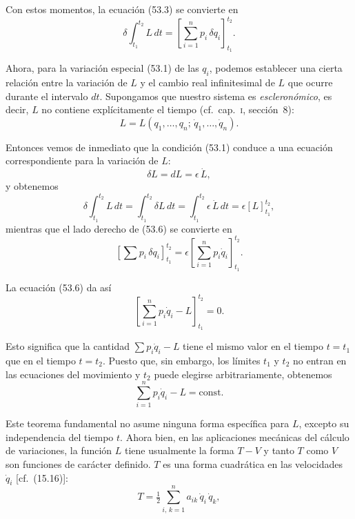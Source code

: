 \documentclass[12pt,a4paper]{book}
\begin{document}
Con estos momentos, la ecuación (53.3) se convierte en
\begin{equation}
\delta \int_{t_1}^{t_2} L \, dt = \left[ \sum_{i=1}^{n} p_i \,\delta q_i \right]_{t_1}^{t_2}. \tag{53.6}
\end{equation}

Ahora, para la variación especial (53.1) de las $q_i$, podemos establecer una cierta relación entre la variación de $L$ y el cambio real infinitesimal de $L$ que ocurre durante el intervalo $dt$. Supongamos que nuestro sistema es \textit{escleronómico}, es decir, $L$ no contiene explícitamente el tiempo (cf.\ cap.~\textsc{i}, sección~8):
\begin{equation}
L = L(q_1, \ldots, q_n;\, \dot{q}_1, \ldots, \dot{q}_n). \tag{53.7}
\end{equation}

Entonces vemos de inmediato que la condición (53.1) conduce a una ecuación correspondiente para la variación de $L$:
\begin{equation}
\delta L = dL = \epsilon\,\dot{L}, \tag{53.8}
\end{equation}
y obtenemos
\begin{equation}
\delta \int_{t_1}^{t_2} L \, dt = \int_{t_1}^{t_2} \delta L \, dt = \int_{t_1}^{t_2} \epsilon\,\dot{L} \, dt = \epsilon \left[ L \right]_{t_1}^{t_2}, \tag{53.9}
\end{equation}
mientras que el lado derecho de (53.6) se convierte en
\begin{equation}
\left[ \sum p_i \,\delta q_i \right]_{t_1}^{t_2} = \epsilon \left[ \sum_{i=1}^{n} p_i \dot{q}_i \right]_{t_1}^{t_2}. \tag{53.10}
\end{equation}


La ecuación (53.6) da así
\begin{equation}
\left[ \sum_{i=1}^{n} p_i \dot{q}_i - L \right]_{t_1}^{t_2} = 0. \tag{53.11}
\end{equation}

Esto significa que la cantidad $\sum p_i \dot{q}_i - L$ tiene el mismo valor en el tiempo $t = t_1$ que en el tiempo $t = t_2$. Puesto que, sin embargo, los límites $t_1$ y $t_2$ no entran en las ecuaciones del movimiento y $t_2$ puede elegirse arbitrariamente, obtenemos
\begin{equation}
\sum_{i=1}^{n} p_i \dot{q}_i - L = \text{const.} \tag{53.12}
\end{equation}

Este teorema fundamental no asume ninguna forma específica para $L$, excepto su independencia del tiempo $t$. Ahora bien, en las aplicaciones mecánicas del cálculo de variaciones, la función $L$ tiene usualmente la forma $T - V$ y tanto $T$ como $V$ son funciones de carácter definido. $T$ es una forma cuadrática en las velocidades $\dot{q}_i$ [cf.\ (15.16)]:
\begin{equation}
T = \tfrac{1}{2} \sum_{i,\,k=1}^{n} a_{ik}\,\dot{q}_i\,\dot{q}_k, \tag{53.13}
\end{equation}
\end{document}
